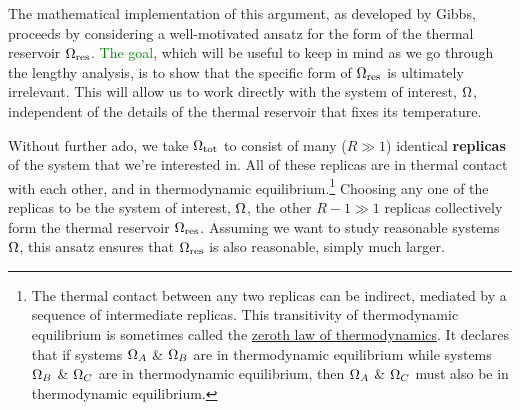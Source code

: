 The mathematical implementation of this argument, as developed by Gibbs, proceeds by considering a well-motivated ansatz for the form of the thermal reservoir $\Omega_{\text{res}}$.
\textcolor{green}{The goal}, which will be useful to keep in mind as we go through the lengthy analysis, is to show that the specific form of $\Omega_{\text{res}}$ is ultimately irrelevant.
This will allow us to work directly with the system of interest, $\Omega$, independent of the details of the thermal reservoir that fixes its temperature.

Without further ado, we take $\Omega_{\text{tot}}$ to consist of many ($R \gg 1$) identical \textbf{replicas} of the system \Om that we're interested in.
All of these replicas are in thermal contact with each other, and in thermodynamic equilibrium.\footnote{The thermal contact between any two replicas can be indirect, mediated by a sequence of intermediate replicas.  This transitivity of thermodynamic equilibrium is sometimes called the \href{https://en.wikipedia.org/wiki/Zeroth_law_of_thermodynamics}{zeroth law of thermodynamics}.  It declares that if systems $\Omega_A$ \& $\Omega_B$ are in thermodynamic equilibrium while systems $\Omega_B$ \& $\Omega_C$ are in thermodynamic equilibrium, then $\Omega_A$ \& $\Omega_C$ must also be in thermodynamic equilibrium.}
Choosing any one of the replicas to be the system of interest, $\Omega$, the other $R - 1 \gg 1$ replicas collectively form the thermal reservoir $\Omega_{\text{res}}$.
Assuming we want to study reasonable systems $\Omega$, this ansatz ensures that $\Omega_{\text{res}}$ is also reasonable, simply much larger.

